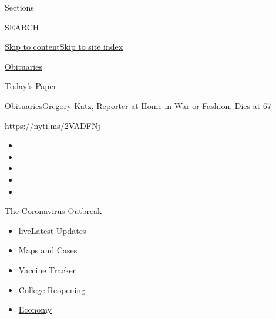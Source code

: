 Sections

SEARCH

\protect\hyperlink{site-content}{Skip to
content}\protect\hyperlink{site-index}{Skip to site index}

\href{https://www.nytimes.com/section/obituaries}{Obituaries}

\href{https://myaccount.nytimes.com/auth/login?response_type=cookie\&client_id=vi}{}

\href{https://www.nytimes.com/section/todayspaper}{Today's Paper}

\href{/section/obituaries}{Obituaries}\textbar{}Gregory Katz, Reporter
at Home in War or Fashion, Dies at 67

\url{https://nyti.ms/2VADFNj}

\begin{itemize}
\item
\item
\item
\item
\item
\end{itemize}

\href{https://www.nytimes.com/news-event/coronavirus?action=click\&pgtype=Article\&state=default\&region=TOP_BANNER\&context=storylines_menu}{The
Coronavirus Outbreak}

\begin{itemize}
\tightlist
\item
  live\href{https://www.nytimes.com/2020/08/03/world/coronavirus-covid-19.html?action=click\&pgtype=Article\&state=default\&region=TOP_BANNER\&context=storylines_menu}{Latest
  Updates}
\item
  \href{https://www.nytimes.com/interactive/2020/us/coronavirus-us-cases.html?action=click\&pgtype=Article\&state=default\&region=TOP_BANNER\&context=storylines_menu}{Maps
  and Cases}
\item
  \href{https://www.nytimes.com/interactive/2020/science/coronavirus-vaccine-tracker.html?action=click\&pgtype=Article\&state=default\&region=TOP_BANNER\&context=storylines_menu}{Vaccine
  Tracker}
\item
  \href{https://www.nytimes.com/2020/08/02/us/covid-college-reopening.html?action=click\&pgtype=Article\&state=default\&region=TOP_BANNER\&context=storylines_menu}{College
  Reopening}
\item
  \href{https://www.nytimes.com/live/2020/08/03/business/stock-market-today-coronavirus?action=click\&pgtype=Article\&state=default\&region=TOP_BANNER\&context=storylines_menu}{Economy}
\end{itemize}


